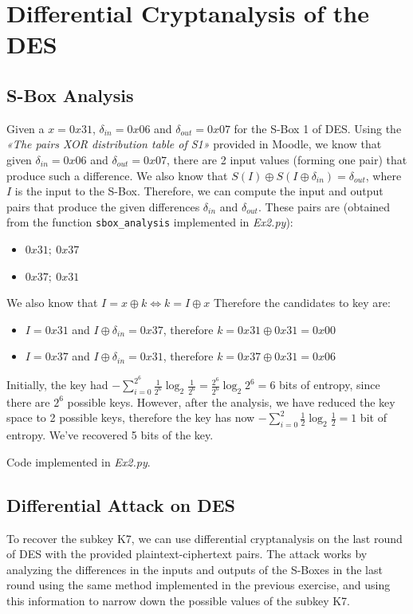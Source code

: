 \documentclass{article}
\begin{document}
\section{Differential Cryptanalysis of the DES}
\subsection{S-Box Analysis}
Given a $x=0x31$, $\delta_{in}=0x06$ and $\delta_{out}=0x07$ for the S-Box 1 of DES. Using the \textit{«The pairs XOR distribution table of S1»} provided in Moodle, we know that given $\delta_{in}=0x06$ and $\delta_{out}=0x07$, there are 2 input values (forming one pair) that produce such a difference.
We also know that $S(I) \oplus S(I \oplus \delta_{in}) = \delta_{out}$, where $I$ is the input to the S-Box. Therefore, we can compute the input and output pairs that produce the given differences $\delta_{in}$ and $\delta_{out}$.
These pairs are (obtained from the function \texttt{sbox\_analysis} implemented in \textit{Ex2.py}):
\begin{itemize}
    \item $0x31;\ 0x37$
    \item $0x37;\ 0x31$
\end{itemize}

We also know that $I = x \oplus k \Leftrightarrow k = I \oplus x$
Therefore the candidates to key are:
\begin{itemize}
    \item $I = 0x31$ and $I \oplus \delta_{in} = 0x37$, therefore $k = 0x31 \oplus 0x31 = 0x00$
    \item $I = 0x37$ and $I \oplus \delta_{in} = 0x31$, therefore $k = 0x37 \oplus 0x31 = 0x06$
\end{itemize}

Initially, the key had $-\sum_{i=0}^{2^6} \frac{1}{2^6} \log_2 \frac{1}{2^6} = \frac{2^6}{2^6} \log_2 2^6 = 6$ bits of entropy, since there are $2^6$ possible keys. However, after the analysis, we have reduced the key space to 2 possible keys, therefore the key has now $-\sum_{i=0}^{2} \frac{1}{2} \log_2 \frac{1}{2} = 1$ bit of entropy. We've recovered 5 bits of the key.

Code implemented in \textit{Ex2.py}.

\subsection{Differential Attack on DES}
To recover the subkey K7, we can use differential cryptanalysis on the last round of DES with the provided plaintext-ciphertext pairs.
The attack works by analyzing the differences in the inputs and outputs of the S-Boxes in the last round using the same method implemented in the previous exercise, and using this information to narrow down the possible values of the subkey K7.
\end{document}
